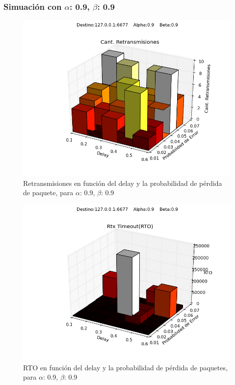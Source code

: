 \subsubsection{Simuación con $\alpha$: 0.9, $\beta$: 0.9}
\begin{figure}[H]
  \centering	
	\includegraphics[scale=0.5]{../analisis/graficos_tablas/graficos_en_funcion_de_delay_probaerror/0.9-0.9/retransmisiones.png}
  \caption{Retransmisiones en funci\'on del delay y la probabilidad de pérdida de paquete, para $\alpha$: 0.9, $\beta$: 0.9}
	\label{fig:histo-src-sitiotrabajo}
\end{figure}

\begin{figure}[H]
  \centering	
	\includegraphics[scale=0.5]{../analisis/graficos_tablas/graficos_en_funcion_de_delay_probaerror/0.9-0.9/rto.png}
  \caption{RTO en función del delay y la probabilidad de pérdida de paquetes, para $\alpha$: 0.9, $\beta$: 0.9}
	\label{fig:histo-src-sitiotrabajo}
\end{figure}

